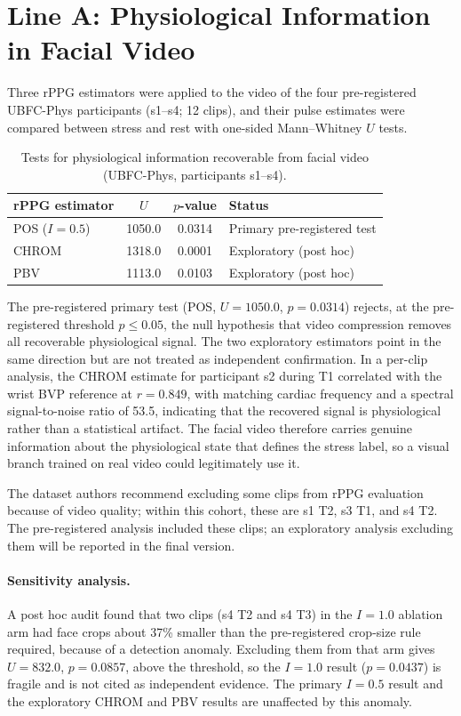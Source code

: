 \section{Line A: Physiological Information in Facial Video}
Three rPPG estimators were applied to the video of the four pre-registered UBFC-Phys participants (s1--s4; 12 clips), and their pulse estimates were compared between stress and rest with one-sided Mann--Whitney $U$ tests.

\begin{table}[htbp]
\centering
\begin{tabular}{@{}lccl@{}}
\toprule
\textbf{rPPG estimator} & \textbf{$U$} & \textbf{$p$-value} & \textbf{Status} \\
\midrule
POS ($I = 0.5$) & 1050.0 & 0.0314 & Primary pre-registered test \\
CHROM & 1318.0 & 0.0001 & Exploratory (post hoc) \\
PBV & 1113.0 & 0.0103 & Exploratory (post hoc) \\
\bottomrule
\end{tabular}
\caption{Tests for physiological information recoverable from facial video (UBFC-Phys, participants s1--s4).}
\label{tab:leakage}
\end{table}

The pre-registered primary test (POS, $U = 1050.0$, $p = 0.0314$) rejects, at the pre-registered threshold $p \le 0.05$, the null hypothesis that video compression removes all recoverable physiological signal. The two exploratory estimators point in the same direction but are not treated as independent confirmation. In a per-clip analysis, the CHROM estimate for participant s2 during T1 correlated with the wrist BVP reference at $r = 0.849$, with matching cardiac frequency and a spectral signal-to-noise ratio of 53.5, indicating that the recovered signal is physiological rather than a statistical artifact. The facial video therefore carries genuine information about the physiological state that defines the stress label, so a visual branch trained on real video could legitimately use it.

The dataset authors recommend excluding some clips from rPPG evaluation because of video quality; within this cohort, these are s1 T2, s3 T1, and s4 T2. The pre-registered analysis included these clips; an exploratory analysis excluding them will be reported in the final version.

\paragraph{Sensitivity analysis.} A post hoc audit found that two clips (s4 T2 and s4 T3) in the $I = 1.0$ ablation arm had face crops about 37\% smaller than the pre-registered crop-size rule required, because of a detection anomaly. Excluding them from that arm gives $U = 832.0$, $p = 0.0857$, above the threshold, so the $I = 1.0$ result ($p = 0.0437$) is fragile and is not cited as independent evidence. The primary $I = 0.5$ result and the exploratory CHROM and PBV results are unaffected by this anomaly.


